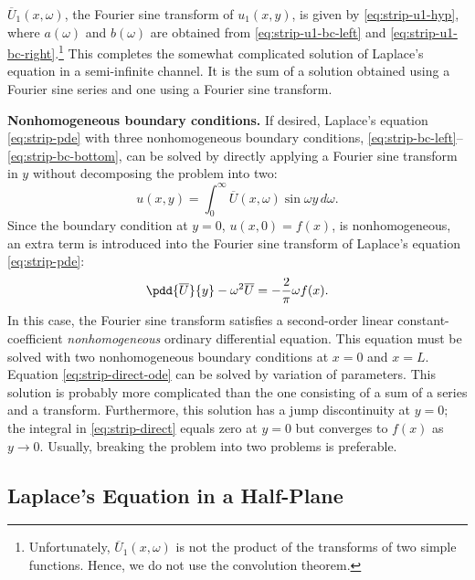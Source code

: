 $\overline{U}_1(x,\omega)$, the Fourier sine transform of $u_1(x,y)$, is given by \eqref{eq:strip-u1-hyp}, where $a(\omega)$ and $b(\omega)$ are obtained from \eqref{eq:strip-u1-bc-left} and \eqref{eq:strip-u1-bc-right}.\footnote{Unfortunately, $\overline{U}_1(x,\omega)$ is not the product of the transforms of two simple functions.  Hence, we do not use the convolution theorem.}  This completes the somewhat complicated solution of Laplace's equation in a semi-infinite channel.  It is the sum of a solution obtained using a Fourier sine series and one using a Fourier sine transform.

\textbf{Nonhomogeneous boundary conditions.}  If desired, Laplace's equation \eqref{eq:strip-pde} with three nonhomogeneous boundary conditions, \eqref{eq:strip-bc-left}--\eqref{eq:strip-bc-bottom}, can be solved by directly applying a Fourier sine transform in $y$ without decomposing the problem into two:
\begin{equation}
\label{eq:strip-direct}
u(x,y) = \int_0^{\infty}\overline{U}(x,\omega)\sin\omega y\,d\omega.
\end{equation}
Since the boundary condition at $y = 0$, $u(x,0) = f(x)$, is nonhomogeneous, an extra term is introduced into the Fourier sine transform of Laplace's equation \eqref{eq:strip-pde}:
\begin{equation}
\label{eq:strip-direct-ode}
\pdd{\overline{U}}{y} - \omega^2\overline{U} = -\frac{2}{\pi}\omega f(x).
\end{equation}
In this case, the Fourier sine transform satisfies a second-order linear constant-coefficient \textit{nonhomogeneous} ordinary differential equation.  This equation must be solved with two nonhomogeneous boundary conditions at $x = 0$ and $x = L$.  Equation \eqref{eq:strip-direct-ode} can be solved by variation of parameters.  This solution is probably more complicated than the one consisting of a sum of a series and a transform.  Furthermore, this solution has a jump discontinuity at $y = 0$; the integral in \eqref{eq:strip-direct} equals zero at $y = 0$ but converges to $f(x)$ as $y \to 0$.  Usually, breaking the problem into two problems is preferable.

\subsection{Laplace's Equation in a Half-Plane}
\label{subsec:laplace-halfplane}

